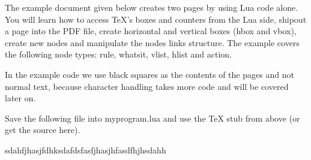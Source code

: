 

\hsize=150pt
The example document given below creates two pages by using Lua code alone. You will learn how to access TeX's boxes and counters from the Lua side, shipout a page into the PDF file, create horizontal and vertical boxes (hbox and vbox), create new nodes and manipulate the nodes links structure. The example covers the following node types: rule, whatsit, vlist, hlist and action.

In the example code we use black squares as the contents of the pages and not normal text, because character handling takes more code and will be covered later on.

Save the following file into myprogram.lua and use the TeX stub from above (or get the source here). 

 sdahfjhasjfdhksdafdsfasfjhasjhfasdfhjhsdahh

\bye
